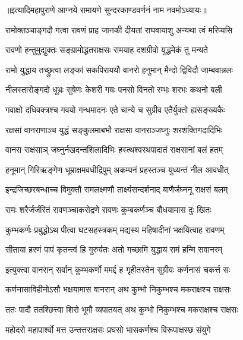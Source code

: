 ॥इत्यादिमहापुराणे आग्नये रामायणे सुन्दरकाण्डवर्णनं नाम नवमोऽध्यायः॥


\twolineshloka
{रामोक्तञ्चाङ्गदौ गत्वा रावणं प्राह जानकी}
{दीयतां राघवायाशु अन्यथा त्वं मरिप्यसि}%

\twolineshloka
{रावणो हन्तुमुद्युक्तः सङ्ग्रामोद्धतराक्षसः}
{रामयाह दशग्रीवो युद्धमेकं तु मन्यते}%

\twolineshloka
{रामो युद्धाय तच्छ्रुत्वा लङ्कां सकपिराययौ}
{वानरो हनुमान् मैन्दो द्विविदौ जाम्बवान्नलः}%

\twolineshloka
{नीलस्तारोङ्गदो धूभ्रः सुषेणः केशरी गयः}
{पनसो विनतो रम्भः शरभः कथनो बली}%

\twolineshloka
{गवाक्षो दधिवक्त्रश्च गवयो गन्धमादनः}
{एते चान्ये च सुग्रीव एतैर्युक्तो ह्यसङ्ख्यकैः}%

\twolineshloka
{रक्षसां वानराणाञ्च युद्धं सङ्कुलमाबभौ}
{राक्षसा वानराञ्जघ्नुः शरशक्तिगदादिभिः}%

\twolineshloka
{वानरा राक्षसाञ् जघ्नुर्नखदन्तशिलादिभिः}
{हस्त्थश्वरथपादातं राक्षसानां बलं हतम्} %

\twolineshloka
{हनूमान् गिरिऋङ्गेण धूम्राक्षमवधीद्रिपुम्}
{अकम्पनं प्रहस्तञ्च युध्यन्तं नील आवधीत्}%

\twolineshloka
{इन्द्रजिच्छरबन्धाच्च विमुक्तौ रामलक्ष्मणौ}
{तार्क्ष्यसन्दर्शनाद् बाणैर्जघ्ननू राक्षसं बलम्}%

\twolineshloka
{रामः शरैर्जर्जरितं रावणञ्चाकरोद्रणे}
{रावणः कुम्बकर्णञ्च बौधयामास दुः खितः}%

\twolineshloka
{कुम्भकर्णः प्रबुद्धोऽथ पीत्वा घटसहस्त्रकम्}
{मद्यस्य महिषादीनां भक्षयित्वाह रावणम्}%

\twolineshloka
{सीताया हरणं पापं कृतन्त्वं हि गुरुर्यतः}
{अतो गच्छामि युद्धाय रामं हन्मि सवानरम्}%

\twolineshloka
{इत्युक्त्वा वानरान् सर्वान् कुम्भकर्णो ममर्द्द ह}
{गृहीतस्तेन सुग्रीवः कर्णनासं चकर्त्त सः}%

\twolineshloka
{कर्णनासाविहीनोऽसौ भक्षयामास वानरान्}
{अथ कुम्भो निकुम्भश्च मकराक्षश्च राक्षसः}%

\twolineshloka
{ततः पादौ ततश्छित्त्वा शिरो भूमौ व्यपातयत् }
{अथ कुम्भो निकुम्भश्च मकराक्षश्च राक्षसः}%

\twolineshloka
{महोदरो महापार्श्वो मत्त उन्तत्तराक्षसः}
{प्रघसो भासकर्णश्च विरूपाक्षस्छ संयुगे}%

